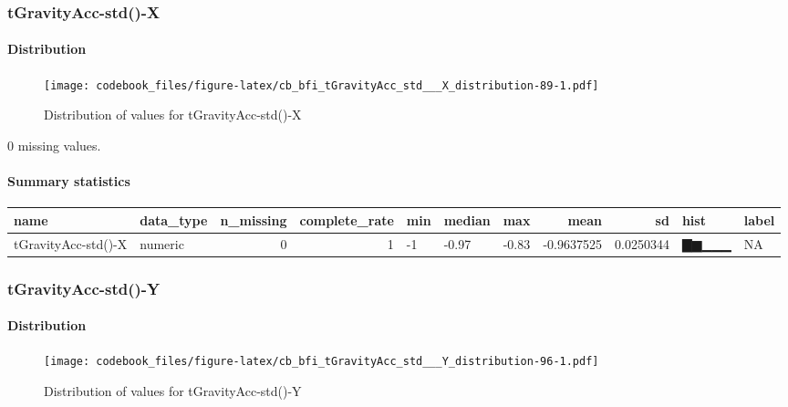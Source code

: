 \documentclass[
]{article}
\begin{document}
\hypertarget{tGravityAcc_std___X}{%
\subsubsection{tGravityAcc-std()-X}\label{tGravityAcc_std___X}}

\hypertarget{tGravityAcc_std___X_distribution}{%
\paragraph{Distribution}\label{tGravityAcc_std___X_distribution}}

\begin{figure}
\centering
\texttt{[image: codebook\_files/figure-latex/cb\_bfi\_tGravityAcc\_std\_\_\_X\_distribution-89-1.pdf]}
\caption{Distribution of values for tGravityAcc-std()-X}
\end{figure}

0 missing values.

\hypertarget{tGravityAcc_std___X_summary}{%
\paragraph{Summary statistics}\label{tGravityAcc_std___X_summary}}

\begin{longtable}[]{@{}llrrlllrrll@{}}
\toprule
name & data\_type & n\_missing & complete\_rate & min & median & max &
mean & sd & hist & label \\
\midrule
\endhead
tGravityAcc-std()-X & numeric & 0 & 1 & -1 & -0.97 & -0.83 & -0.9637525
& 0.0250344 & ▇▆▁▁▁ & NA \\
\bottomrule
\end{longtable}

\hypertarget{tGravityAcc_std___Y}{%
\subsubsection{tGravityAcc-std()-Y}\label{tGravityAcc_std___Y}}

\hypertarget{tGravityAcc_std___Y_distribution}{%
\paragraph{Distribution}\label{tGravityAcc_std___Y_distribution}}

\begin{figure}
\centering
\texttt{[image: codebook\_files/figure-latex/cb\_bfi\_tGravityAcc\_std\_\_\_Y\_distribution-96-1.pdf]}
\caption{Distribution of values for tGravityAcc-std()-Y}
\end{figure}
\end{document}
